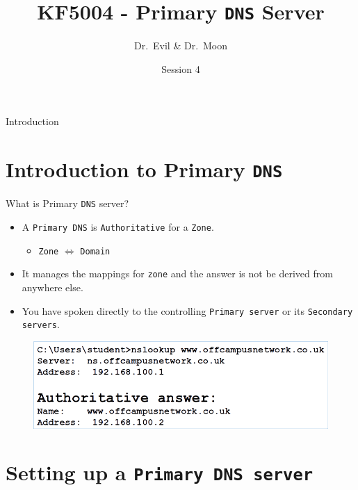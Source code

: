 \documentclass[aspectratio=169,xcolor=table]{beamer}
\title{KF5004 - Primary \texttt{DNS} Server}
\author{Dr.~Evil \& Dr.~Moon}
\institute[Northumbria University] %
{
  Department of Computer and Information Sciences\\
  University of Northumbria
}
\date{Session 4}
\begin{document}
\begin{frame}
  \titlepage
\end{frame}

\begin{frame}{Introduction}
  \tableofcontents
\end{frame}


\section{Introduction to Primary \texttt{DNS}}
\begin{frame}{What is Primary \texttt{DNS} server?}
  \begin{itemize}
    \item A \texttt{Primary DNS} is \texttt{Authoritative} for a \texttt{Zone}.
      \begin{itemize}
          \item \texttt{Zone} $\Longleftrightarrow$ \texttt{Domain}
      \end{itemize}
    \item It manages the mappings for \texttt{zone} and the answer is not be derived from anywhere else.
    \item You have spoken directly to the controlling \texttt{Primary server} or its \texttt{Secondary servers}.
  \end{itemize}
  \begin{figure}
    \begin{center}
      \includegraphics[width=0.8\linewidth]{Authoritative.png}
    \end{center}
  \end{figure}
\end{frame}

\section{Setting up a \texttt{Primary DNS server}}
\end{document}
